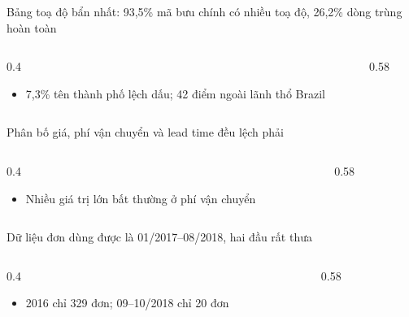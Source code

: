 \begin{frame}{Bảng toạ độ bẩn nhất: 93,5\% mã bưu chính có nhiều toạ độ, 26,2\% dòng trùng hoàn toàn}
\begin{columns}[T]\begin{column}{0.4\textwidth}
\begin{itemize}
  \item 7,3\% tên thành phố lệch dấu; 42 điểm ngoài lãnh thổ Brazil
\end{itemize}
\end{column}\begin{column}{0.58\textwidth}
\begin{center}\end{center}
\end{column}\end{columns}

\end{frame}

\begin{frame}{Phân bố giá, phí vận chuyển và lead time đều lệch phải}
\begin{columns}[T]\begin{column}{0.4\textwidth}
\begin{itemize}
  \item Nhiều giá trị lớn bất thường ở phí vận chuyển
\end{itemize}
\end{column}\begin{column}{0.58\textwidth}
\begin{center}\end{center}
\end{column}\end{columns}

\end{frame}

\begin{frame}{Dữ liệu đơn dùng được là 01/2017–08/2018, hai đầu rất thưa}
\begin{columns}[T]\begin{column}{0.4\textwidth}
\begin{itemize}
  \item 2016 chỉ 329 đơn; 09–10/2018 chỉ 20 đơn
\end{itemize}
\end{column}\begin{column}{0.58\textwidth}
\begin{center}\end{center}
\end{column}\end{columns}

\end{frame}

